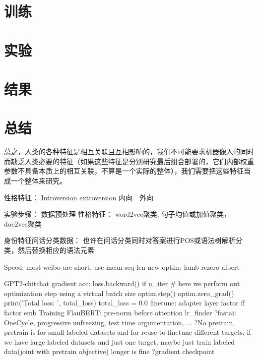 \documentclass[letterpaper]{article} %
\begin{document}
\begin{CJK*}{UTF8}{gbsn}
\section{训练}

\section{实验}

\section{结果}

\section{总结}

总之，人类的各种特征是相互关联且互相影响的，我们不可能要求机器像人的同时而缺乏人类必要的特征（如果这些特征是分别研究最后组合部署的，它们内部权重参数不具备本质上的相互关联，不算是一个实际的整体），我们需要把这些特征当成一个整体来研究。

性格特征：
Introversion extroversion 
内向　外向

实验步骤：
数据预处理
  性格特征：
    word2vec聚类, 句子均值或加值聚类，doc2vec聚类

  身份特征问话分类数据：
    也许在问话分类同时对答案进行POS或语法树解析分类，然后替换相应的语法元素

  Speed:
      most weibo are short, use mean seq len 
      new optim: lamb
      rezero
      albert 

      GPT2-chitchat
      gradient acc:
         loss.backward() 
         if n_iter %
            # here we perform out optimization step using a virtual batch size
            optim.step()
            optim.zero_grad()
            print('Total loss: ', total_loss)
            total_loss = 0.0
      finetune: adapter layer
      factor ff
      factor emb
      Training FlauBERT: pre-norm before attention
      lr_finder
      ?fastai: OneCycle, progressive unfreezing, test time argumentation, ...
      ?No pretrain, pretrain is for small labeled datasets and for reuse to finetune different targets, 
        if we have large labeled datasets and just one target,
        maybe just train labeled data(joint with pretrain objective) longer is fine
      ?gradient checkpoint


\end{CJK*}
\end{document}
